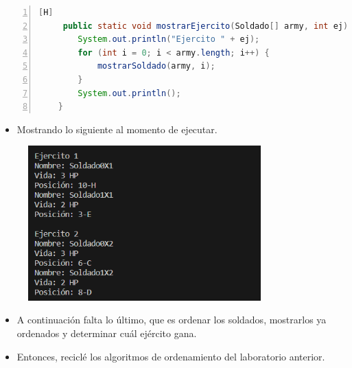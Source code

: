 \documentclass{article}
\begin{document}
	\begin{lstlisting}[language=java,caption={Mostrando el ejército}, numbers=left][H]
	 public static void mostrarEjercito(Soldado[] army, int ej) {
        System.out.println("Ejercito " + ej);
        for (int i = 0; i < army.length; i++) {
            mostrarSoldado(army, i);
        }
        System.out.println();
    }
	\end{lstlisting}
	\begin{itemize}	
		\item Mostrando lo siguiente al momento de ejecutar.
	\end{itemize}
	
	\begin{figure}[H]
		\centering
	\includegraphics[width=0.8\textwidth,keepaspectratio]{img/captura3.png}
	\end{figure}
	
	\begin{itemize}	
		\item A continuación falta lo último, que es ordenar los soldados, mostrarlos ya ordenados y determinar cuál ejército gana.
		\item Entonces, reciclé los algoritmos de ordenamiento del laboratorio anterior.
	\end{itemize}
	
\end{document}
